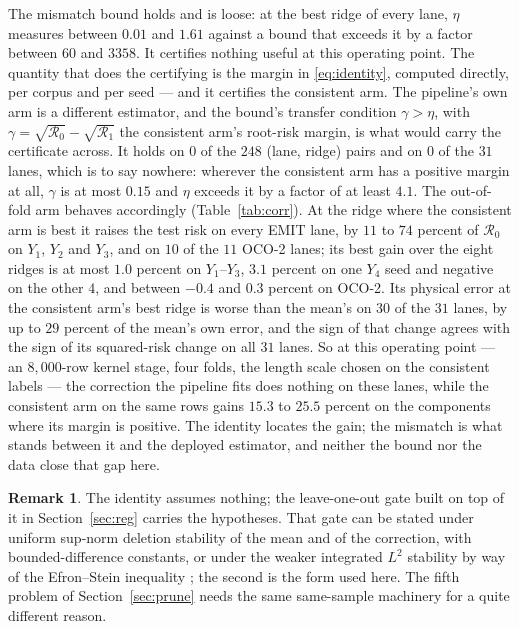 \documentclass[11pt]{article}
\theoremstyle{definition}
\newtheorem{remark}[theorem]{Remark}
\newcommand{\numCorrLanes}{31}
\newcommand{\numCorrPairs}{248}
\newcommand{\numEtaMax}{1.61}
\newcommand{\numEtaMin}{0.01}
\newcommand{\numGainemitYOne}{25.5}
\newcommand{\numGainemitYThree}{15.3}
\newcommand{\numGammaMax}{0.15}
\newcommand{\numOofAtEmitRiseMax}{74}
\newcommand{\numOofAtEmitRiseMin}{11}
\newcommand{\numOofAtOcoLanes}{11}
\newcommand{\numOofAtOcoNeg}{10}
\newcommand{\numOofBestEmitMax}{1.0}
\newcommand{\numOofBestOcoMax}{0.3}
\newcommand{\numOofBestOcoMin}{-0.4}
\newcommand{\numOofBestYfourMax}{3.1}
\newcommand{\numOofBestYfourNeg}{4}
\newcommand{\numOofPhysNeg}{30}
\newcommand{\numOofPhysWorseMax}{29}
\newcommand{\numSlackMax}{3358}
\newcommand{\numSlackMin}{60}
\newcommand{\numTransferLanes}{0}
\newcommand{\numTransferPairs}{0}
\newcommand{\numTransferSlackMin}{4.1}
\begin{document}
The mismatch bound holds and is loose: at the best ridge of every lane, $\eta$ measures between
$\numEtaMin$ and $\numEtaMax$ against a bound that exceeds it by a factor between $\numSlackMin$ and
$\numSlackMax$. It certifies nothing useful at this operating point. The quantity that does the
certifying is the margin in \eqref{eq:identity}, computed directly, per corpus and per seed --- and
it certifies the consistent arm. The pipeline's own arm is a different estimator, and the bound's
transfer condition $\gamma>\eta$, with $\gamma=\sqrt{\mathcal R_0}-\sqrt{\mathcal R_1}$ the
consistent arm's root-risk margin, is what would carry the certificate across. It holds on
$\numTransferPairs$ of the $\numCorrPairs$ (lane, ridge) pairs and on $\numTransferLanes$ of the
$\numCorrLanes$ lanes, which is to say nowhere: wherever the consistent arm has a positive margin at
all, $\gamma$ is at most $\numGammaMax$ and $\eta$ exceeds it by a factor of at least
$\numTransferSlackMin$. The out-of-fold
arm behaves accordingly (Table~\ref{tab:corr}). At the ridge
where the consistent arm is best it raises the test risk on every EMIT lane, by
$\numOofAtEmitRiseMin$ to $\numOofAtEmitRiseMax$ percent of $\mathcal R_0$ on $Y_1$, $Y_2$ and
$Y_3$, and on $\numOofAtOcoNeg$ of the $\numOofAtOcoLanes$ OCO-2 lanes; its best gain over the eight
ridges is at most $\numOofBestEmitMax$ percent on $Y_1$--$Y_3$, $\numOofBestYfourMax$ percent on one
$Y_4$ seed and negative on the other $\numOofBestYfourNeg$, and between $\numOofBestOcoMin$ and
$\numOofBestOcoMax$ percent on OCO-2. Its physical error at the consistent arm's best ridge is worse
than the mean's on $\numOofPhysNeg$ of the $\numCorrLanes$ lanes, by up to $\numOofPhysWorseMax$
percent of the mean's own error, and the sign of that change agrees with the sign of its squared-risk
change on all $\numCorrLanes$ lanes. So at this
operating point --- an $8{,}000$-row kernel stage, four folds, the length scale chosen on the
consistent labels --- the correction the pipeline fits does nothing on these lanes, while the
consistent arm on the same rows gains $\numGainemitYThree$ to $\numGainemitYOne$ percent on the
components where its margin is positive. The identity locates the gain; the mismatch is what stands
between it and the deployed estimator, and neither the bound nor the data close that gap here.

\begin{remark}
The identity assumes nothing; the leave-one-out gate built on top of it in Section~\ref{sec:reg}
carries the hypotheses. That gate can be stated under uniform sup-norm deletion stability of the mean
and of the correction, with bounded-difference constants, or under the weaker integrated $L^2$
stability by way of the Efron--Stein inequality \cite{EfronStein}; the second is the form used here.
The fifth problem of Section~\ref{sec:prune} needs the same same-sample machinery for a quite
different reason.
\end{remark}
\end{document}
